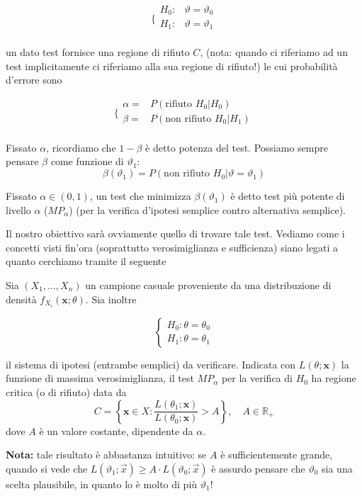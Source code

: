 $$\bigg \{
\begin{array}{rl}
H_0: & \vartheta = \vartheta_0 \\
H_1: & \vartheta = \vartheta_1 \\
\end{array}
$$

un dato test fornisce una regione di rifiuto $C$, (nota: quando ci riferiamo ad un test implicitamente ci riferiamo alla sua regione di rifiuto!) le cui probabilità d'errore sono

$$\bigg \{
\begin{array}{rl}
\alpha =&  P(\text{rifiuto } H_0 | H_0) \\
\beta =& P(\text{non rifiuto } H_0 | H_1) \\
\end{array}
$$

Fissato $\alpha$, ricordiamo che $1 - \beta$ è detto potenza del test. Possiamo sempre pensare $\beta$ come funzione di $\vartheta_1$:
$$\beta(\vartheta_1) = P(\text{non rifiuto } H_0 | \vartheta = \vartheta_1)$$

\begin{definizione}
 Fissato $\alpha \in (0,1)$, un test che minimizza $\beta(\vartheta_1)$ è detto test più potente di livello $\alpha$ ($MP_\alpha$) \small{(per la verifica d'ipotesi semplice contro alternativa semplice)}. 

\end{definizione}

Il nostro obiettivo sarà ovviamente quello di trovare tale test. Vediamo come i concetti visti fin'ora (soprattutto verosimiglianza e sufficienza) siano legati a quanto cerchiamo tramite il seguente

\begin{lem}
Sia \((X_1,\dots,X_n)\) un campione casuale proveniente da una distribuzione di densità \(f_{X_i}(\mathbf{x}; \theta)\).
Sia inoltre

\begin{equation*}
  \begin{cases}
    H_0 \colon \theta = \theta_0 \\ H_1 \colon \theta = \theta_1
  \end{cases}
\end{equation*}

il sistema di ipotesi (entrambe semplici) da verificare. Indicata con \(L(\theta;\mathbf{x})\) la funzione di massima verosimiglianza, 
il test $MP_\alpha$ per la verifica di \(H_0\) ha regione critica (o di rifiuto) data da
\begin{equation*}
  C = \left\lbrace \mathbf{x} \in X \colon
      \frac{L(\theta_1;\mathbf{x})}{L(\theta_0;\mathbf{x})} > A
      \right\rbrace, \quad A \in \mathbb{R}_+
\end{equation*}
dove \(A\) è un valore costante, dipendente da \(\alpha{}\).
\end{lem}
\textbf{Nota:} tale risultato è abbastanza intuitivo: se $A$ è sufficientemente grande, 
quando si vede che $L(\vartheta_1;\vec{x}) \geq A \cdot L(\vartheta_0;\vec{x})$ 
è assurdo pensare che $\vartheta_0$ sia una scelta plausibile, in quanto lo è molto di più $\vartheta_1$!

